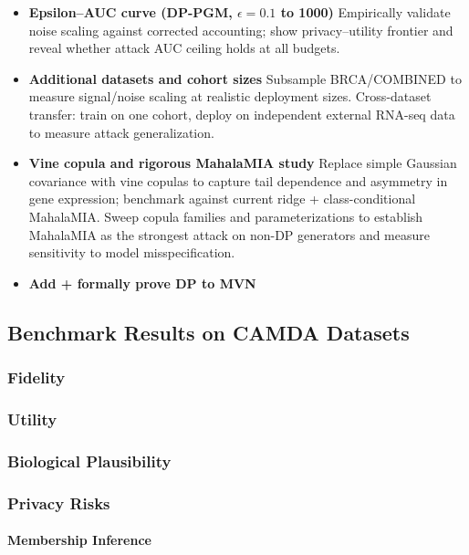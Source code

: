 \documentclass[webpdf,contemporary,large]{oup-authoring-template}%
\theoremstyle{thmstyleone}%
\theoremstyle{thmstyletwo}%
\theoremstyle{thmstylethree}%
\begin{document}
\begin{itemize}
\item \textbf{Epsilon--AUC curve (DP-PGM, $\epsilon = 0.1$ to 1000)} Empirically validate noise scaling against corrected accounting; show privacy--utility frontier and reveal whether attack AUC ceiling holds at all budgets.
\item \textbf{Additional datasets and cohort sizes} Subsample BRCA/COMBINED to measure signal/noise scaling at realistic deployment sizes. Cross-dataset transfer: train on one cohort, deploy on independent external RNA-seq data to measure attack generalization.
\item \textbf{Vine copula and rigorous MahalaMIA study} Replace simple Gaussian covariance with vine copulas to capture tail dependence and asymmetry in gene expression; benchmark against current ridge + class-conditional MahalaMIA. Sweep copula families and parameterizations to establish MahalaMIA as the strongest attack on non-DP generators and measure sensitivity to model misspecification.
\item \textbf{Add + formally prove DP to MVN}
\end{itemize}




\subsection{Benchmark Results on CAMDA Datasets}

\subsubsection{Fidelity}


\subsubsection{Utility}

\subsubsection{Biological Plausibility}

\subsubsection{Privacy Risks}
\paragraph{Membership Inference}
\end{document}
